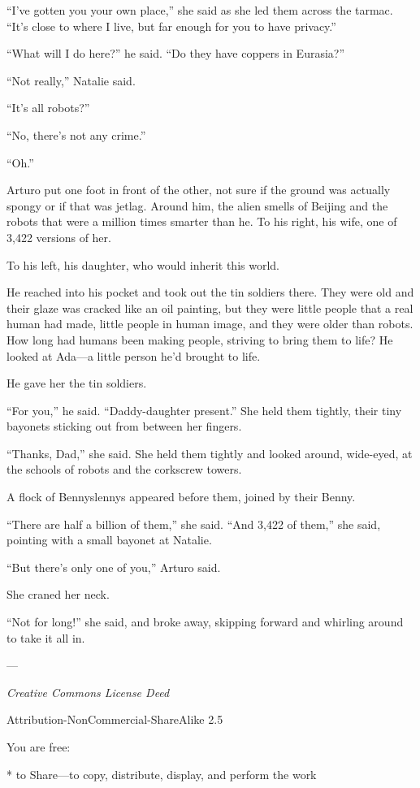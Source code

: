 “I’ve gotten you your own place,” she said as she led them across
the tarmac. “It’s close to where I live, but far enough for you to
have privacy.”

“What will I do here?” he said. “Do they have coppers in Eurasia?”

“Not really,” Natalie said.

“It’s all robots?”

“No, there’s not any crime.”

“Oh.”

Arturo put one foot in front of the other, not sure if the ground
was actually spongy or if that was jetlag. Around him, the alien
smells of Beijing and the robots that were a million times smarter
than he. To his right, his wife, one of 3,422 versions of her.

To his left, his daughter, who would inherit this world.

He reached into his pocket and took out the tin soldiers there.
They were old and their glaze was cracked like an oil painting, but
they were little people that a real human had made, little people
in human image, and they were older than robots. How long had
humans been making people, striving to bring them to life? He
looked at Ada—a little person he’d brought to life.

He gave her the tin soldiers.

“For you,” he said. “Daddy-daughter present.” She held them
tightly, their tiny bayonets sticking out from between her
fingers.

“Thanks, Dad,” she said. She held them tightly and looked around,
wide-eyed, at the schools of robots and the corkscrew towers.

A flock of Bennyslennys appeared before them, joined by their
Benny.

“There are half a billion of them,” she said. “And 3,422 of them,”
she said, pointing with a small bayonet at Natalie.

“But there’s only one of you,” Arturo said.

She craned her neck.

“Not for long!” she said, and broke away, skipping forward and
whirling around to take it all in.

—

\emph{Creative Commons License Deed}

Attribution-NonCommercial-ShareAlike 2.5

You are free:

* to Share—to copy, distribute, display, and perform the work

